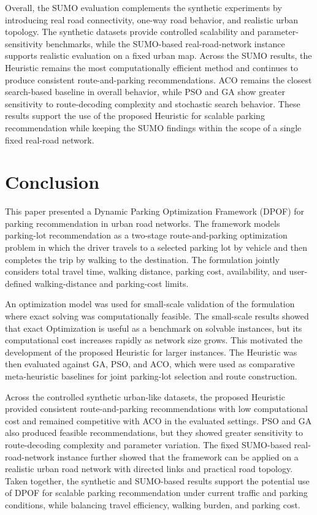 Overall, the SUMO evaluation complements the synthetic experiments by introducing real road connectivity, one-way road behavior, and realistic urban topology. The synthetic datasets provide controlled scalability and parameter-sensitivity benchmarks, while the SUMO-based real-road-network instance supports realistic evaluation on a fixed urban map. Across the SUMO results, the Heuristic remains the most computationally efficient method and continues to produce consistent route-and-parking recommendations. ACO remains the closest search-based baseline in overall behavior, while PSO and GA show greater sensitivity to route-decoding complexity and stochastic search behavior. These results support the use of the proposed Heuristic for scalable parking recommendation while keeping the SUMO findings within the scope of a single fixed real-road network.

\section{Conclusion}

This paper presented a Dynamic Parking Optimization Framework (DPOF) for parking recommendation in urban road networks. The framework models parking-lot recommendation as a two-stage route-and-parking optimization problem in which the driver travels to a selected parking lot by vehicle and then completes the trip by walking to the destination. The formulation jointly considers total travel time, walking distance, parking cost, availability, and user-defined walking-distance and parking-cost limits.

An optimization model was used for small-scale validation of the formulation where exact solving was computationally feasible. The small-scale results showed that exact Optimization is useful as a benchmark on solvable instances, but its computational cost increases rapidly as network size grows. This motivated the development of the proposed Heuristic for larger instances. The Heuristic was then evaluated against GA, PSO, and ACO, which were used as comparative meta-heuristic baselines for joint parking-lot selection and route construction.

Across the controlled synthetic urban-like datasets, the proposed Heuristic provided consistent route-and-parking recommendations with low computational cost and remained competitive with ACO in the evaluated settings. PSO and GA also produced feasible recommendations, but they showed greater sensitivity to route-decoding complexity and parameter variation. The fixed SUMO-based real-road-network instance further showed that the framework can be applied on a realistic urban road network with directed links and practical road topology. Taken together, the synthetic and SUMO-based results support the potential use of DPOF for scalable parking recommendation under current traffic and parking conditions, while balancing travel efficiency, walking burden, and parking cost.

